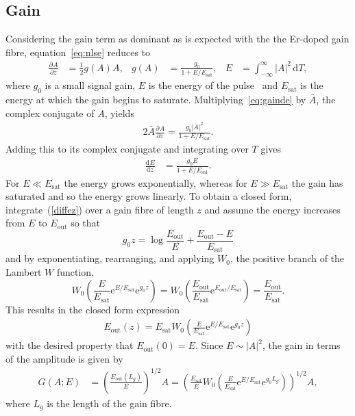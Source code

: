 \documentclass[12pt]{article}
\providecommand{\df}{\textrm{d}}
\newcommand{\diff}[3][]{\frac{\textrm{d}^{#1}#2}{\textrm{d}{#3}^{#1}}}
\newcommand{\pdiff}[3][]{\frac{\partial^{#1}#2}{\partial{#3}^{#1}}}
\newcommand{\Es}{E_{\textrm{sat}}}
\begin{document}
\subsection{Gain}
Considering the gain term as dominant as is expected with the 
the Er-doped gain fibre, equation~\eqref{eq:nlse} reduces to
\begin{align}
\label{eq:gainde}
	\pdiff{A}{z} &= \frac{1}{2} g(A) A,& g(A) &= \frac{g_0}{1 + E / \Es},& E &= \int_{-\infty}^\infty |A|^2 \, \df T,
\end{align}
where $g_0$ is a small signal gain, $E$ is the energy of the 
pulse~\cite{bohun, burgoyne2014, shtyrina, silfvast, yarutkina} and $\Es$ is the energy at which the gain 
begins to saturate.
Multiplying~\eqref{eq:gainde} by $\bar{A}$, the complex conjugate of $A$, yields
\begin{align*}
	2\bar{A} \pdiff{A}{z} = \frac{g_0 |A|^2}{1 + E / \Es}.
\end{align*}
Adding this to its complex conjugate and integrating over $T$ gives
\begin{align}
\label{diffez}
	\diff{E}{z} &= \frac{g_0 E}{1 + E / \Es}.
\end{align}
For $E \ll \Es$ the energy grows exponentially, whereas for $E \gg \Es$ the gain has saturated and so the energy grows linearly.  To obtain a closed form, integrate~(\ref{diffez}) over a gain fibre of length $z$ and assume the energy 
increases from $E$ to $E_{\textrm{out}}$ so that
\[
	g_0 z = \log\frac{E_{\textrm{out}}}{E} + \frac{E_{\textrm{out}}-E}{\Es}
\]
and by exponentiating, rearranging, and applying $W_0$, the positive branch of the Lambert $W$ function,
\[
	 W_0\left(\frac{E}{\Es} \textrm{e}^{E/\Es} \textrm{e}^{g_0 z}\right) = 
	 W_0\left(\frac{E_{\textrm{out}}}{\Es} \textrm{e}^{E_{\textrm{out}}/\Es}\right) = \frac{E_{\textrm{out}}}{\Es}.
\]
This results in the closed form expression
\begin{align}
\label{eq:energy}
	E_{\textrm{out}}(z) = \Es W_0 \left( \frac{E}{\Es} \textrm{e}^{E/\Es} \textrm{e}^{g_0 z} \right)
\end{align}
with the desired property that $E_{\textrm{out}}(0)=E$.  Since $E \sim |A|^2$, the gain in terms of 
the amplitude is given by
\begin{align}
\label{eq:gain}
	G(A;E) &= \left(\frac{E_{\textrm{out}}(L_g)}{E}\right)^{1/2}A = 
	\left( \frac{\Es}{E} W_0 \left( \frac{E}{\Es} \textrm{e}^{E/\Es} 
	\textrm{e}^{g_0 L_g} \right) \right)^{1/2} A,
\end{align}
where $L_g$ is the length of the gain fibre.
\end{document}
